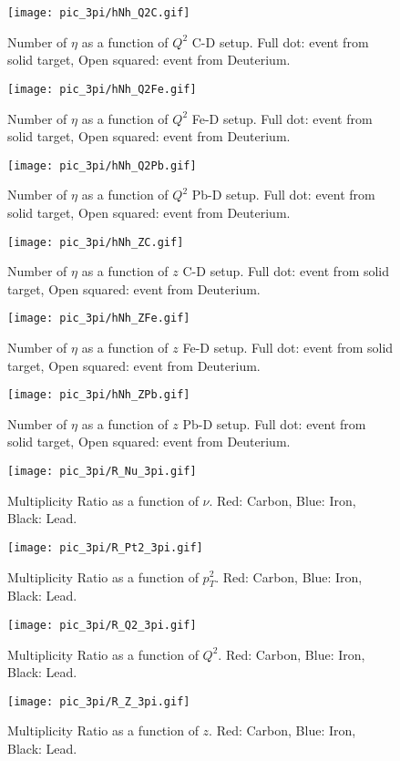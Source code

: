 \begin{figure}[H]
\centering
\texttt{[image: pic\_3pi/hNh\_Q2C.gif]}
\caption{Number of $\eta$ as a function of $Q^2$ C-D setup. Full dot: event from solid target, Open squared: event from Deuterium.}
\label{fig:Nh_eta_3pi_Q2_C}
\end{figure}

\begin{figure}[H]
\centering
\texttt{[image: pic\_3pi/hNh\_Q2Fe.gif]}
\caption{Number of $\eta$ as a function of $Q^2$ Fe-D setup. Full dot: event from solid target, Open squared: event from Deuterium.}
\label{fig:Nh_eta_3pi_Q2_Fe}
\end{figure}

\begin{figure}[H]
\centering
\texttt{[image: pic\_3pi/hNh\_Q2Pb.gif]}
\caption{Number of $\eta$ as a function of $Q^2$ Pb-D setup. Full dot: event from solid target, Open squared: event from Deuterium.}
\label{fig:Nh_eta_3pi_Q2_Pb}
\end{figure}


\begin{figure}[H]
\centering
\texttt{[image: pic\_3pi/hNh\_ZC.gif]}
\caption{Number of $\eta$ as a function of $z$ C-D setup. Full dot: event from solid target, Open squared: event from Deuterium.}
\label{fig:Nh_eta_3pi_Z_C}
\end{figure}
%
\begin{figure}[H]
\centering
\texttt{[image: pic\_3pi/hNh\_ZFe.gif]}
\caption{Number of $\eta$ as a function of $z$ Fe-D setup. Full dot: event from solid target, Open squared: event from Deuterium.}
\label{fig:Nh_eta_3pi_Z_Fe}
\end{figure}
%
\begin{figure}[H]
\centering
\texttt{[image: pic\_3pi/hNh\_ZPb.gif]}
\caption{Number of $\eta$ as a function of $z$ Pb-D setup. Full dot: event from solid target, Open squared: event from Deuterium.}
\label{fig:Nh_eta_3pi_Z_Pb}
\end{figure}
%
\begin{figure}[H]
\centering
\texttt{[image: pic\_3pi/R\_Nu\_3pi.gif]}
\caption{Multiplicity Ratio as a function of $\nu$. Red: Carbon, Blue: Iron, Black: Lead.}
\label{fig:MR_eta_3pi_Nu}
\end{figure}
%
\begin{figure}[H]
\centering
\texttt{[image: pic\_3pi/R\_Pt2\_3pi.gif]}
\caption{Multiplicity Ratio as a function of $p_T^2$. Red: Carbon, Blue: Iron, Black: Lead.}
\label{fig:MR_eta_3pi_Pt2}
\end{figure}
%
\begin{figure}[H]
\centering
\texttt{[image: pic\_3pi/R\_Q2\_3pi.gif]}
\caption{Multiplicity Ratio as a function of $Q^2$. Red: Carbon, Blue: Iron, Black: Lead.}
\label{fig:MR_eta_3pi_Q2}
\end{figure}
%
\begin{figure}[H]
\centering
\texttt{[image: pic\_3pi/R\_Z\_3pi.gif]}
\caption{Multiplicity Ratio as a function of $z$. Red: Carbon, Blue: Iron, Black: Lead.}
\label{fig:MR_eta_3pi_z}
\end{figure}
%
